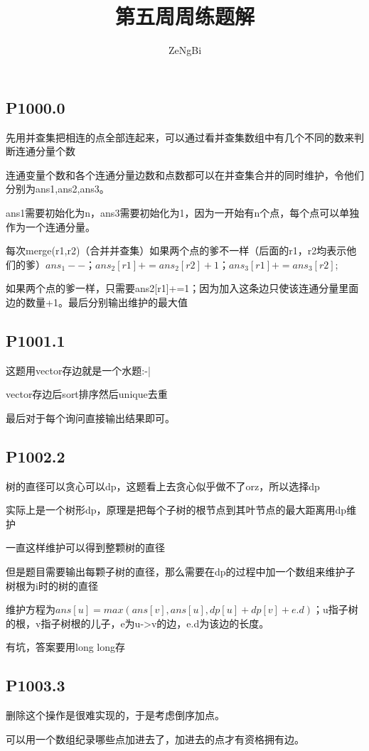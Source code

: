 \documentclass[UTF8]{ctexart}
\title{第五周周练题解}
\author{ZeNgBi}
\date{}
\begin{document}
	\maketitle
	\subsection*{P1000.0}
	先用并查集把相连的点全部连起来，可以通过看并查集数组中有几个不同的数来判断连通分量个数
	
	连通变量个数和各个连通分量边数和点数都可以在并查集合并的同时维护，令他们分别为ans1,ans2,ans3。
	
	ans1需要初始化为n，ans3需要初始化为1，因为一开始有n个点，每个点可以单独作为一个连通分量。
	
	每次merge(r1,r2)（合并并查集）如果两个点的爹不一样（后面的r1，r2均表示他们的爹）$ans_1--$；$ans_2[r1]+=ans_2[r2]+1$；$ans_3[r1]+=ans_3[r2]$;
	
	如果两个点的爹一样，只需要ans2[r1]+=1；因为加入这条边只使该连通分量里面边的数量+1。最后分别输出维护的最大值
	\subsection*{P1001.1}
	这题用vector存边就是一个水题:-|
	
	vector存边后sort排序然后unique去重
	
	最后对于每个询问直接输出结果即可。
	\subsection*{P1002.2}
	树的直径可以贪心可以dp，这题看上去贪心似乎做不了orz，所以选择dp
	
	实际上是一个树形dp，原理是把每个子树的根节点到其叶节点的最大距离用dp维护
	
	一直这样维护可以得到整颗树的直径
	
	但是题目需要输出每颗子树的直径，那么需要在dp的过程中加一个数组来维护子树根为i时的树的直径
	
	维护方程为$ans[u]=max(ans[v],ans[u],dp[u]+dp[v]+e.d)$；u指子树的根，v指子树根的儿子，e为u->v的边，e.d为该边的长度。
	
	有坑，答案要用long long存
	
	\subsection*{P1003.3}
	删除这个操作是很难实现的，于是考虑倒序加点。
	
	可以用一个数组纪录哪些点加进去了，加进去的点才有资格拥有边。
	
\end{document}
